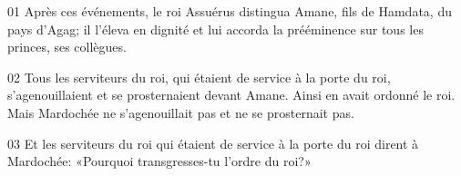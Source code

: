 01 Après ces événements, le roi Assuérus distingua Amane, fils de Hamdata, du pays d’Agag; il l’éleva en dignité et lui accorda la prééminence sur tous les princes, ses collègues.

02 Tous les serviteurs du roi, qui étaient de service à la porte du roi, s’agenouillaient et se prosternaient devant Amane. Ainsi en avait ordonné le roi. Mais Mardochée ne s’agenouillait pas et ne se prosternait pas.

03 Et les serviteurs du roi qui étaient de service à la porte du roi dirent à Mardochée: «Pourquoi transgresses-tu l’ordre du roi?»
